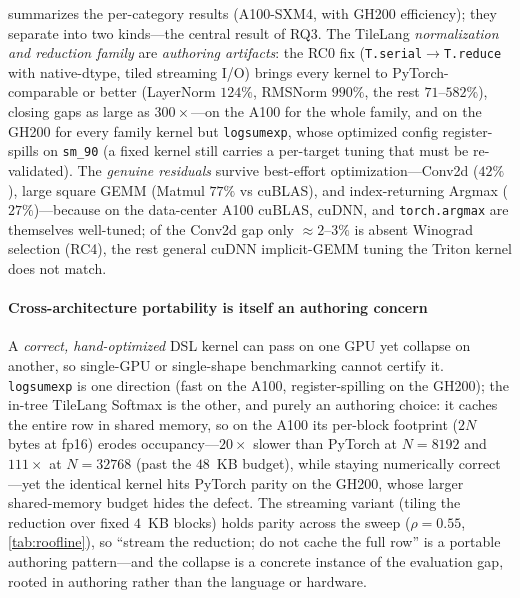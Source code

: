  summarizes the per-category results (A100-SXM4, with GH200 efficiency); they separate into two kinds---the central result of RQ3.
The TileLang \emph{normalization and reduction family} are \emph{authoring artifacts}: the RC0 fix (\texttt{T.serial}$\to$\texttt{T.reduce} with native-dtype, tiled streaming I/O) brings every kernel to PyTorch-comparable or better (LayerNorm $124\%$, RMSNorm $990\%$, the rest $71$--$582\%$), closing gaps as large as $300\times$---on the A100 for the whole family, and on the GH200 for every family kernel but \texttt{logsumexp}, whose optimized config register-spills on \texttt{sm\_90} (a fixed kernel still carries a per-target tuning that must be re-validated).
The \emph{genuine residuals} survive best-effort optimization---Conv2d ($42\%$), large square GEMM (Matmul $77\%$ vs cuBLAS), and index-returning Argmax ($27\%$)---because on the data-center A100 cuBLAS, cuDNN, and \texttt{torch.argmax} are themselves well-tuned; of the Conv2d gap only ${\approx}2$--$3\%$ is absent Winograd selection (RC4), the rest general cuDNN implicit-GEMM tuning the Triton kernel does not match.

\paragraph{Cross-architecture portability is itself an authoring concern}
A \emph{correct, hand-optimized} DSL kernel can pass on one GPU yet collapse on another, so single-GPU or single-shape benchmarking cannot certify it.
\texttt{logsumexp} is one direction (fast on the A100, register-spilling on the GH200); the in-tree TileLang Softmax is the other, and purely an authoring choice: it caches the entire row in shared memory, so on the A100 its per-block footprint ($2N$ bytes at fp16) erodes occupancy---$20\times$ slower than PyTorch at $N{=}8192$ and $111\times$ at $N{=}32768$ (past the $48$~KB budget), while staying numerically correct---yet the identical kernel hits PyTorch parity on the GH200, whose larger shared-memory budget hides the defect.
The streaming variant (tiling the reduction over fixed $4$~KB blocks) holds parity across the sweep ($\rho{=}0.55$, \cref{tab:roofline}), so ``stream the reduction; do not cache the full row'' is a portable authoring pattern---and the collapse is a concrete instance of the evaluation gap, rooted in authoring rather than the language or hardware.

